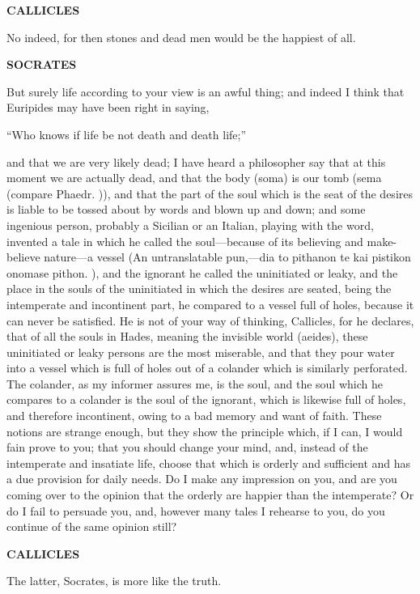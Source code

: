 \documentclass[11pt,letter]{article}
\begin{document}
\par \textbf{CALLICLES}
\par   No indeed, for then stones and dead men would be the happiest of all.

\par \textbf{SOCRATES}
\par   But surely life according to your view is an awful thing; and indeed I think that Euripides may have been right in saying,

\par  “Who knows if life be not death and death life;”

\par  and that we are very likely dead; I have heard a philosopher say that at this moment we are actually dead, and that the body (soma) is our tomb (sema (compare Phaedr. )), and that the part of the soul which is the seat of the desires is liable to be tossed about by words and blown up and down; and some ingenious person, probably a Sicilian or an Italian, playing with the word, invented a tale in which he called the soul—because of its believing and make-believe nature—a vessel (An untranslatable pun,—dia to pithanon te kai pistikon onomase pithon. ), and the ignorant he called the uninitiated or leaky, and the place in the souls of the uninitiated in which the desires are seated, being the intemperate and incontinent part, he compared to a vessel full of holes, because it can never be satisfied. He is not of your way of thinking, Callicles, for he declares, that of all the souls in Hades, meaning the invisible world (aeides), these uninitiated or leaky persons are the most miserable, and that they pour water into a vessel which is full of holes out of a colander which is similarly perforated. The colander, as my informer assures me, is the soul, and the soul which he compares to a colander is the soul of the ignorant, which is likewise full of holes, and therefore incontinent, owing to a bad memory and want of faith. These notions are strange enough, but they show the principle which, if I can, I would fain prove to you; that you should change your mind, and, instead of the intemperate and insatiate life, choose that which is orderly and sufficient and has a due provision for daily needs. Do I make any impression on you, and are you coming over to the opinion that the orderly are happier than the intemperate? Or do I fail to persuade you, and, however many tales I rehearse to you, do you continue of the same opinion still?

\par \textbf{CALLICLES}
\par   The latter, Socrates, is more like the truth.
\end{document}
